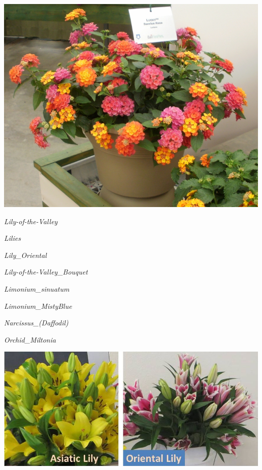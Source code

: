\documentclass{article}
\begin{document}
\begin{center}
\includegraphics[height=0.9\textheight, angle=90]{../Lantana2.jpg}
\end{center}
\newpage

\noindent
\vfill
\centerline{{\Large\emph{Lily-of-the-Valley}}}
\vfill
\newpage

\noindent
\vfill
\centerline{{\Large\emph{Lilies}}}
\vfill
\newpage

\noindent
\vfill
\centerline{{\Large\emph{Lily_Oriental}}}
\vfill
\newpage

\noindent
\vfill
\centerline{{\Large\emph{Lily-of-the-Valley_Bouquet}}}
\vfill
\newpage

\noindent
\vfill
\centerline{{\Large\emph{Limonium_sinuatum}}}
\vfill
\newpage

\noindent
\vfill
\centerline{{\Large\emph{Limonium_MistyBlue}}}
\vfill
\newpage

\noindent
\vfill
\centerline{{\Large\emph{Narcissus_(Daffodil)}}}
\vfill
\newpage

\noindent
\vfill
\centerline{{\Large\emph{Orchid_Miltonia}}}
\vfill
\newpage

\begin{center}
\includegraphics[height=0.9\textheight, angle=90]{../Lilies.jpg}
\end{center}
\newpage
\end{document}
